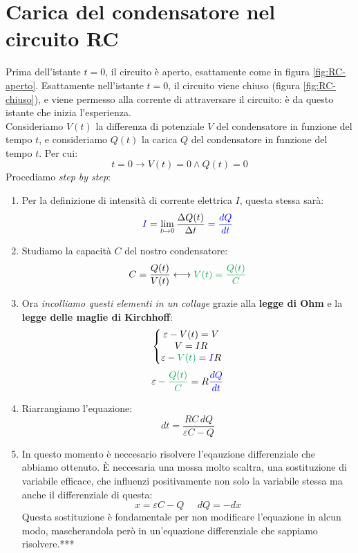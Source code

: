 \documentclass[a3paper, twoside, openany]{book}
\theoremstyle{definition}
\begin{document}
\section{Carica del condensatore nel circuito RC}
Prima dell'istante $t=0$, il circuito è aperto, esattamente come in figura \ref{fig:RC-aperto}. Esattamente nell'istante $t=0$, il circuito viene chiuso (figura \ref{fig:RC-chiuso}), e viene permesso alla corrente di attraversare il circuito: è da questo istante che inizia l'esperienza. \\ Consideriamo $V(t)$ la differenza di potenziale $V$ del condensatore in funzione del tempo $t$, e consideriamo $Q(t)$ la carica $Q$ del condensatore in funzione del tempo $t$. Per cui: $$t=0\longrightarrow V(t)=0 \wedge Q(t)=0$$ Procediamo \emph{step by step}:
\begin{enumerate}
\item Per la definizione di intensità di corrente elettrica $I$, questa stessa sarà: \begin{equation}\textcolor{blue}{I}=\lim_{t\mapsto 0}\frac{\Delta Q(t)}{\Delta t}=\textcolor{blue}{\frac{dQ}{dt}}\end{equation}
\item Studiamo la capacità $C$ del nostro condensatore: \begin{equation}C=\frac{Q(t)}{V(t)}\longleftrightarrow \textcolor{Green}{V(t)=\frac{Q(t)}{C}}\end{equation}
\item Ora \emph{incolliamo questi elementi in un collage} grazie alla \textbf{legge di Ohm} e la \textbf{legge delle maglie di Kirchhoff}:
\begin{equation}\left\{
\begin{matrix}
\varepsilon-V(t)=V\\
V=IR\\
\varepsilon-\textcolor{Green}{V(t)}=\textcolor{blue}{I}R
\end{matrix}
\right.\end{equation} \begin{equation}\varepsilon-\textcolor{Green}{\frac{Q(t)}{C}}=R\textcolor{blue}{\frac{dQ}{dt}}\end{equation}
\item Riarrangiamo l'equazione: \begin{equation}dt=\frac{RC\,dQ}{\varepsilon C-Q}\end{equation}
\item In questo momento è neccesario risolvere l'eqauzione differenziale che abbiamo ottenuto. È neccesaria una mossa molto scaltra, una sostituzione di variabile efficace, che influenzi positivamente non solo la variabile stessa ma anche il differenziale di questa: \begin{equation}x=\varepsilon C-Q\;\;\;\;\;dQ=-dx\end{equation} Questa sostituzione è fondamentale per non modificare l'equazione in alcun modo, mascherandola però in un'equazione differenziale che sappiamo risolvere.***

\end{enumerate}
\end{document}
